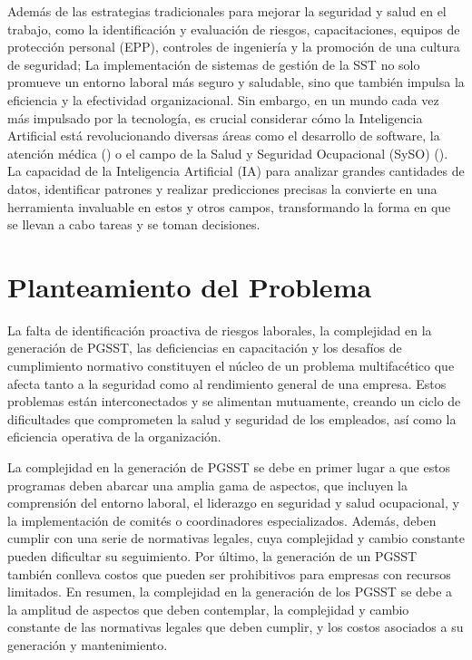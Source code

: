 Además de las estrategias tradicionales para mejorar la seguridad y salud en el trabajo, como la identificación y evaluación de riesgos, capacitaciones, equipos de protección personal (EPP), controles de ingeniería y la promoción de una cultura de seguridad; La implementación de sistemas de gestión de la SST no solo promueve un entorno laboral más seguro y saludable, sino que también impulsa la eficiencia y la efectividad organizacional. Sin embargo, en un mundo cada vez más impulsado por la tecnología, es crucial considerar cómo la Inteligencia Artificial está revolucionando diversas áreas como el desarrollo de software, la atención médica (\cite{Ellahham2020}) o el campo de la Salud y Seguridad Ocupacional (SySO) (\cite{Jarota2023}). La capacidad de la Inteligencia Artificial (IA) para analizar grandes cantidades de datos, identificar patrones y realizar predicciones precisas la convierte en una herramienta invaluable en estos y otros campos, transformando la forma en que se llevan a cabo tareas y se toman decisiones. 
\section{Planteamiento del Problema}
La falta de identificación proactiva de riesgos laborales, la complejidad en la generación
de PGSST, las deficiencias en capacitación y los desafíos de cumplimiento normativo constituyen el núcleo de un problema multifacético que afecta tanto a la seguridad como al rendimiento general de una empresa. Estos problemas están interconectados y se alimentan mutuamente, creando un ciclo de dificultades que comprometen la salud y seguridad de los empleados, así como la eficiencia operativa de la organización.

La complejidad en la generación de PGSST se debe en primer lugar a que estos programas deben abarcar una amplia gama de aspectos, que incluyen la comprensión del entorno laboral, el liderazgo en seguridad y salud ocupacional, y la implementación de comités o coordinadores especializados. Además, deben cumplir con una serie de normativas legales, cuya complejidad y cambio constante pueden dificultar su seguimiento. Por último, la generación de un PGSST también conlleva costos que pueden ser prohibitivos para empresas con recursos limitados. En resumen, la complejidad en la generación de los PGSST se debe a la amplitud de aspectos que deben contemplar, la complejidad y cambio constante de las normativas legales que deben cumplir, y los costos asociados a su generación y mantenimiento.

